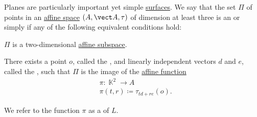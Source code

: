 \begin{definition}\label{def:affine_plane}\mimprovised
  Planes are particularly important yet simple \hyperref[con:geometric_shape]{surfaces}. We say that the set \( \Pi \) of points in an \hyperref[def:affine_space]{affine space} \( (A, \vect A, \tau) \) of dimension at least three is an  or simply  if any of the following equivalent conditions hold:

  \begin{thmenum}
     \( \Pi \) is a two-dimensional \hyperref[def:affine_subspace]{affine subspace}.

     There exists a point \( o \), called the , and linearly independent vectors \( d \) and \( e \), called the , such that \( \Pi \) is the image of the \hyperref[def:affine_operator]{affine function}
    \begin{equation}\label{eq:def:affine_plane/parametric}
      \begin{aligned}
        &\pi: \BbbK^2 \to A \\
        &\pi(t, r) \coloneqq \tau_{t d + r e}(o).
      \end{aligned}
    \end{equation}

    We refer to the function \( \pi \) as a  of \( L \).
  \end{thmenum}
\end{definition}
